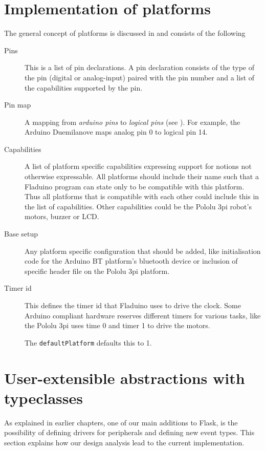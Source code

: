 \documentclass[a4paper, oneside, final]{memoir}
\let\Fref\undefined
\begin{document}
\section{Implementation of platforms}
\label{sec:defining platforms}

The general concept of platforms is discussed in \Fref{sec:platforms} and
consists of the following

\begin{description}
\item[Pins] This is a list of pin declarations. A pin
  declaration consists of the type of the pin (digital or analog-input) paired
  with the pin number and a list of the capabilities supported by the pin.

\item[Pin map] A mapping from \textit{arduino pins} to
  \textit{logical pins} (see \Fref{sec:pins}).  For example, the Arduino
  Duemilanove maps analog pin 0 to logical pin 14.

\item[Capabilities] A list of platform specific capabilities
  expressing support for notions not otherwise expressable.  All
  platforms should include their name such that a Fladuino program can
  state only to be compatible with this platform. Thus all platforms
  that is compatible with each other could include this in the list of
  capabilities. Other capabilities could be the Pololu 3pi robot's
  motors, buzzer or LCD.

\item[Base setup] Any platform specific configuration that should be
  added, like initialisation code for the Arduino BT platform's
  bluetooth device or inclusion of specific header file on the Pololu
  3pi platform.

\item[Timer id] This defines the timer id that Fladuino uses to drive
  the clock. Some Arduino compliant hardware reserves different timers
  for various tasks, like the Pololu 3pi uses time 0 and timer 1 to
  drive the motors.

  The \texttt{defaultPlatform} defaults this to 1.
\end{description}


\section{User-extensible abstractions with typeclasses}
\label{sec:user-extens-abstr}
As explained in earlier chapters, one of our main additions to Flask,
is the possibility of defining drivers for peripherals and defining
new event types. This section explains how our design analysis lead to
the current implementation.
\end{document}
